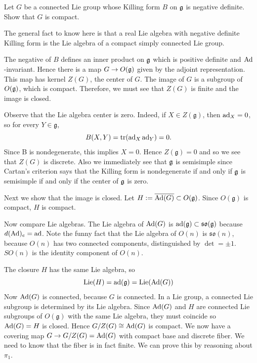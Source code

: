 \documentclass[12pt]{article}
\begin{document}
\begin{exercise}
    Let $G$ be a connected Lie group whose Killing form $B$ on $\mathfrak{g}$ is negative definite. Show that $G$ is compact.
\end{exercise}

The general fact to know here is that a real Lie algebra with negative definite Killing form is the Lie algebra of a compact simply connected Lie group.
\begin{solution}
    The negative of $B$ defines an inner product on $\mathfrak{g}$ which is positive definite and $\operatorname{Ad}$-invariant. Hence there is a map $G \to O(\mathfrak{g})$ given by the adjoint representation. This map has kernel $Z(G)$, the center of $G$. The image of $G$ is a subgroup of $O(\mathfrak{g})$, which is compact. Therefore, we must see that $Z(G)$ is finite and the image is closed.

    Observe that the Lie algebra center is zero. Indeed, if $X\in Z(\mathfrak g)$, then \(\operatorname{ad}_X=0\), so for every $Y\in\mathfrak g$,
    \[
        B(X,Y)=\operatorname{tr}(\operatorname{ad}_X\operatorname{ad}_Y)=0.
    \]
    Since B is nondegenerate, this implies $X=0$. Hence $Z(\mathfrak g) = 0$ and so we see that $Z(G)$ is discrete. Also we immediately see that $\mathfrak{g}$ is semisimple since Cartan's criterion says that the Killing form is nondegenerate if and only if $\mathfrak{g}$ is semisimple if and only if the center of $\mathfrak{g}$ is zero.

    Next we show that the image is closed.
    Let $H := \overline{\operatorname{Ad}(G)} \subset O(\mathfrak{g})$.
    Since $O(\mathfrak{g})$ is compact, $H$ is compact.

    Now compare Lie algebras. The Lie algebra of $\operatorname{Ad}(G)$ is $\operatorname{ad}(\mathfrak{g}) \subset \mathfrak{so}(\mathfrak{g})$
    because $d(\operatorname{Ad})_e = \operatorname{ad}$. Note the funny fact that the Lie algebra of $O(n)$ is $\mathfrak{so}(n)$, 	because $O(n)$ has two connected components, distinguished by $\det=\pm 1$. $SO(n)$ is the identity component of $O(n)$.

    The closure $H$ has the same Lie algebra, so
    \[
        \operatorname{Lie}(H) = \operatorname{ad}(\mathfrak{g}) = \operatorname{Lie}(\operatorname{Ad}(G))
    \]
    Now $\operatorname{Ad}(G)$ is connected, because $G$ is connected. In a Lie group, a connected Lie subgroup is determined by its Lie algebra. Since $\operatorname{Ad}(G)$ and $H$ are connected Lie subgroups of $O(\mathfrak{g})$ with the same Lie algebra, they must coincide so $\operatorname{Ad}(G) = H$ is closed. Hence $G/Z(G) \cong \operatorname{Ad}(G)$ is compact. We now have a covering map $G \to G/Z(G) = \operatorname{Ad}(G)$ with compact base and discrete fiber. We need to know that the fiber is in fact finite. We can prove this by reasoning about $\pi_1$.


\end{solution}
\end{document}
